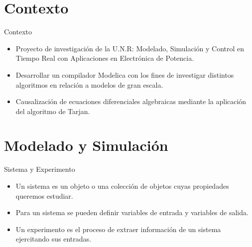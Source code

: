 \section{Contexto}

\begin{frame}{Contexto}
    \begin{itemize}
        \item<1-> Proyecto de investigación de la U.N.R: Modelado, Simulación y Control en Tiempo Real con Aplicaciones en Electrónica de Potencia.
        \item<2-> Desarrollar un compilador Modelica con los fines de investigar distintos algoritmos en relación a modelos de gran escala.
        \item<3-> Causalización de ecuaciones diferenciales algebraicas mediante la aplicación del algoritmo de Tarjan.
    \end{itemize}
\end{frame}

\section{Modelado y Simulación}

\begin{frame}{Sistema y Experimento}
	\begin{itemize}
        \item<1-> Un sistema es un objeto o una colección de objetos cuyas propiedades queremos estudiar.
	  	\item<2-> Para un sistema se pueden definir variables de entrada y variables de salida.
        \item<3-> Un experimento es el proceso de extraer información de un sistema ejercitando sus entradas.
	\end{itemize}
\end{frame}

